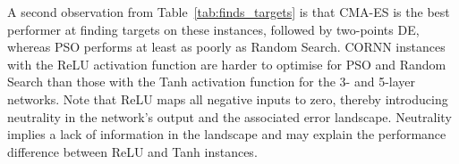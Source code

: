 \documentclass[acmsmall,screen,review,anonymous]{acmart}
\begin{document}
A second observation from Table~\ref{tab:finds_targets} is that CMA-ES is the best performer at finding targets on these instances, followed by two-points DE, whereas PSO performs at least as poorly as Random Search. CORNN instances with the ReLU activation function are harder to optimise for PSO and Random Search than those with the Tanh activation function for the 3- and 5-layer networks. Note that ReLU maps all negative inputs to zero, thereby introducing neutrality in the network's output and the associated error landscape. Neutrality implies a lack of information in the landscape and may explain the performance difference between ReLU and Tanh instances. 
%
\end{document}
